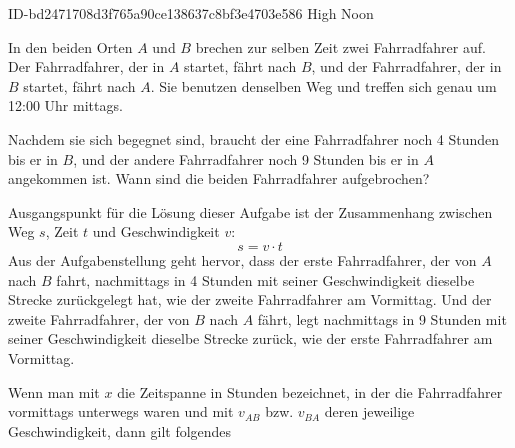 \begin{exercise}
      {ID-bd2471708d3f765a90ce138637c8bf3e4703e586}
      {High Noon}
  \ifproblem\problem\par
    In den beiden Orten $A$ und $B$ brechen zur selben Zeit zwei Fahrradfahrer auf.
    Der Fahrradfahrer, der in $A$ startet, fährt nach $B$, und der Fahrradfahrer, der
    in $B$ startet, fährt nach $A$. Sie benutzen denselben Weg und treffen sich genau um
    12:00 Uhr mittags.
    \begin{center}
    \end{center}
    Nachdem sie sich begegnet sind, braucht der eine Fahrradfahrer noch 4
    Stunden bis er in $B$, und der andere Fahrradfahrer noch 9 Stunden bis
    er in $A$ angekommen ist. Wann sind die beiden Fahrradfahrer aufgebrochen?
  \fi
  \ifoutline\outline\par
    Ausgangspunkt für die Lösung dieser Aufgabe ist der Zusammenhang
    zwischen Weg $s$, Zeit $t$ und Geschwindigkeit $v$:
    \begin{equation*}
      s=v\cdot t
    \end{equation*}
    Aus der Aufgabenstellung geht hervor, dass der erste Fahrradfahrer,
    der von $A$ nach $B$ fahrt, nachmittags in 4 Stunden mit seiner
    Geschwindigkeit dieselbe Strecke zurückgelegt hat, wie der zweite
    Fahrradfahrer am Vormittag.
    Und der zweite Fahrradfahrer, der von $B$ nach $A$ fährt, legt
    nachmittags in 9 Stunden mit seiner Geschwindigkeit dieselbe Strecke
    zurück, wie der erste Fahrradfahrer am Vormittag.\par
    Wenn man mit $x$ die Zeitspanne in Stunden bezeichnet, in der die
    Fahrradfahrer vormittags unterwegs waren und mit $v_{AB}$ bzw.
    $v_{BA}$ deren jeweilige Geschwindigkeit, dann gilt folgendes

\end{exercise}

